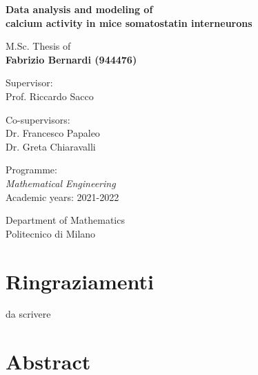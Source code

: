 \documentclass[12pt, a4paper]{report}
\newcommand{\myName}{Fabrizio Bernardi (944476)
}
\newcommand{\myTitle}{Data analysis and modeling of \\ calcium activity in   mice somatostatin interneurons}
\newcommand{\myDegree}{Programme: \protect\\ \textit{Mathematical Engineering} \\
Academic years: 2021-2022}
\newcommand{\myDepartment}{Department of Mathematics}
\newcommand{\myUni}{Politecnico di Milano}
\begin{document}
\begin{titlepage}
\begin{minipage}{\linewidth}
\begin{minipage}{0.45\linewidth}
\begin{figure}[H]
				\end{figure}
			\end{minipage}
		\end{minipage}
		
		\begin{addmargin}[0cm]{-0cm}
			\setlength{\parindent}{0pt}
			\vfill
			
			{\huge\bfseries\myTitle}
			
			\vspace{2cm}
			
			{\Large M.Sc. Thesis of\\[0.125cm]}
			{\LARGE\bfseries\myName}
			
			\vspace{1cm}
			
			\large
			Supervisor:\\[0.125cm]
			{\Large Prof. Riccardo Sacco}
			
			\vspace{0.5cm}
			
			\large
			Co-supervisors:\\[0.125cm]
			{\Large Dr. Francesco Papaleo \\
			Dr. Greta Chiaravalli}
			
			\vspace{1cm}
			
			\myDegree
			
			\vspace{0.5cm}
			
			\myDepartment \\
			\myUni
			
			\vfill
		\end{addmargin}
	\end{titlepage}
	
	
	\chapter*{Ringraziamenti}
	
	da scrivere

	
	
	\chapter*{Abstract}
	
\end{document}
